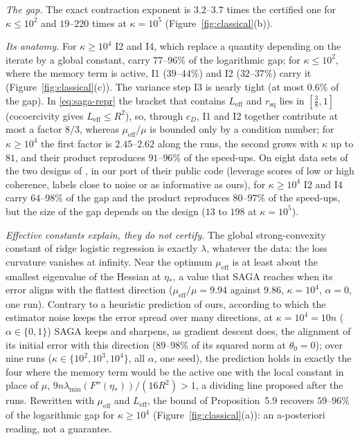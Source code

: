 \documentclass[10pt]{article}
\theoremstyle{remark}
\newcommand{\lmin}{\lambda_{\min}}
\newcommand{\etas}{\eta_\ast}
\newcommand{\muEff}{\mu_{\mathrm{eff}}}
\newcommand{\LEff}{L_{\mathrm{eff}}}
\begin{document}
\begin{description}[leftmargin=2.3em,labelwidth=2.0em,labelsep=0.3em,itemsep=1pt,topsep=3pt,parsep=0pt,font=\normalfont\bfseries]
\item[(C1)] \emph{The gap.} The exact contraction exponent is $3.2$--$3.7$ times the certified one for
$\kappa\le10^2$ and $19$--$220$ times at $\kappa=10^5$ (Figure~\ref{fig:classical}(b)).
\item[(C2)] \emph{Its anatomy.} For $\kappa\ge10^4$ I2 and I4, which replace a quantity depending on the iterate by a
global constant, carry $77$--$96\%$ of the logarithmic gap; for $\kappa\le10^2$, where the memory term is active, I1
($39$--$44\%$) and I2 ($32$--$37\%$) carry it (Figure~\ref{fig:classical}(c)). The variance step I3 is nearly tight (at
most $0.6\%$ of the gap). In \eqref{eq:saga-repr} the bracket that contains $\LEff$ and $r_{\mathrm{sq}}$ lies in
$[\frac38,1]$ (cocoercivity gives $\LEff\le R^2$), so, through $c_D$, I1 and I2 together contribute at most a factor $8/3$,
whereas $\muEff/\mu$ is bounded only by a condition number; for $\kappa\ge10^4$ the first factor is $2.45$--$2.62$ along
the runs, the second grows with $\kappa$ up to $81$, and their product reproduces $91$--$96\%$ of the speed-ups.
On eight data sets of the two designs of \cite{na2023hessian}, in our port of their public code (leverage scores of
low or high coherence, labels close to noise or as informative as ours), for $\kappa\ge10^4$ I2 and I4 carry
$64$--$98\%$ of the gap and the product reproduces $80$--$97\%$ of the speed-ups, but the size of the gap depends on the
design ($13$ to $198$ at $\kappa=10^5$).
\item[(C3)] \emph{Effective constants explain, they do not certify.} The global strong-convexity constant of ridge
logistic regression is exactly $\lambda$, whatever the data: the loss curvature vanishes at infinity. Near the optimum
$\muEff$ is at least about the smallest eigenvalue of the Hessian at $\etas$, a value that SAGA reaches when its error
aligns with the flattest direction ($\muEff/\mu=9.94$ against $9.86$, $\kappa=10^4$, $\alpha=0$, one run).
Contrary to a heuristic prediction of ours, according to which the estimator noise keeps the error spread over many
directions, at $\kappa=10^4=10n$ ($\alpha\in\{0,1\}$) SAGA keeps and sharpens, as gradient descent does, the alignment
of its initial error with this direction ($89$--$98\%$ of its squared norm at $\theta_0=0$); over nine runs
($\kappa\in\{10^2,10^3,10^4\}$, all $\alpha$, one seed), the prediction holds in exactly the four where the memory term
would be the active one with the local constant in place of $\mu$, $9n\lmin(F''(\etas))/(16R^2)>1$, a dividing line
proposed after the runs.
Rewritten
with $\muEff$ and $\LEff$, the bound of Proposition~5.9 recovers $59$--$96\%$ of the logarithmic gap for $\kappa\ge10^4$
(Figure~\ref{fig:classical}(a)): an a-posteriori reading, not a guarantee.
\end{description}
\end{document}
